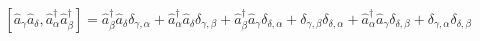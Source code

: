 \documentclass[12pt]{article}
\begin{document}
  \begin{equation}
    \left[ \hat{a}_{\gamma} \hat{a}_{\delta}, \hat{a}^\dagger_{\alpha} \hat{a}^\dagger_{\beta} \right] = \hat{a}^\dagger_{\beta} \hat{a}_{\delta} \delta_{\gamma,\alpha}+\hat{a}^\dagger_{\alpha} \hat{a}_{\delta} \delta_{\gamma,\beta}+\hat{a}^\dagger_{\beta} \hat{a}_{\gamma} \delta_{\delta,\alpha}+\delta_{\gamma,\beta} \delta_{\delta,\alpha}+\hat{a}^\dagger_{\alpha} \hat{a}_{\gamma} \delta_{\delta,\beta}+\delta_{\gamma,\alpha} \delta_{\delta,\beta}
  \end{equation}
\end{document}
